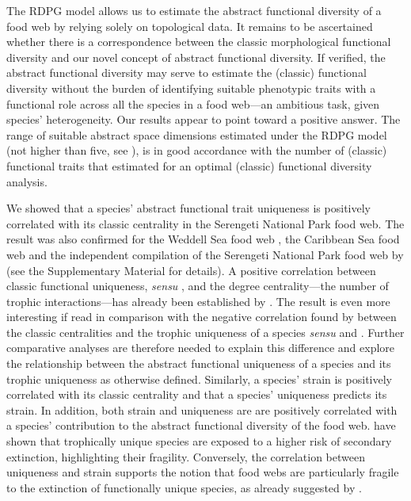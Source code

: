 \documentclass[12pt]{article}
\begin{document}
The RDPG model allows us to estimate the abstract functional
diversity of a food web by relying solely on topological data. It remains to
be ascertained whether there is a correspondence between the classic
morphological functional diversity and our novel concept of abstract
functional diversity. If verified, the abstract functional diversity may serve
to estimate the (classic) functional diversity without the burden of
identifying suitable phenotypic traits with a functional role across all the
species in a food web---an ambitious task, given species' heterogeneity.  Our results appear to point toward a positive answer. The
range of suitable abstract space dimensions estimated under the RDPG model (not
higher than five, see \citep{dallariva2015exploring}), is in good accordance
with the number of (classic) functional traits that  \citet{maire2015many}
estimated for an optimal (classic) functional diversity analysis.

We showed that a species' abstract functional trait uniqueness is positively
correlated with its classic centrality in the Serengeti National Park food web.
The result was also confirmed for the Weddell Sea food web
\citep{jennings2002long}, the Caribbean Sea food web \citep{opitz1996trophic}
and the independent compilation of the Serengeti National Park food web by \citet{de2011serengeti}
(see the Supplementary Material for details).
A positive correlation between classic functional uniqueness, \emph{sensu}
\citet{yodzis1999search},  and the degree centrality---the number of trophic
interactions---has already been established by \citet{petchey2008trophically}.  The
result is even more interesting if read in comparison with the negative
correlation found by \citet{lai2012centrality} between the classic centralities
and the trophic uniqueness of a species \emph{sensu} \citet{luczkovich2003defining}
and \citet{jordan2009trophic}.  Further comparative analyses are therefore
needed to explain this difference and explore the relationship between the abstract
functional uniqueness of a species and its trophic uniqueness as otherwise
defined. Similarly, a species' strain  is positively correlated with its
classic centrality and that a species' uniqueness predicts its strain. In
addition, both strain and uniqueness are are positively correlated
with a species' contribution to the abstract functional diversity of the food
web. \citet{petchey2008trophically} have shown that trophically unique species
are exposed to a higher risk of secondary extinction, highlighting their
fragility. Conversely, the correlation between uniqueness and strain supports
the notion that food webs are particularly fragile to the extinction of
functionally unique species, as already suggested by \citet{o2010loss}.
\end{document}

